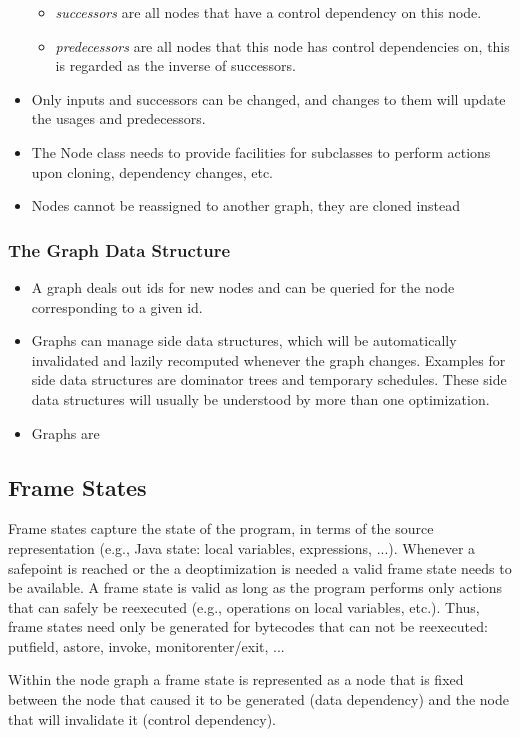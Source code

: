 \documentclass[twocolumn]{svjour3}
\begin{document}
\begin{itemize}
\begin{itemize}
        \item \emph{successors} are all nodes that have a control dependency on this node.
        \item \emph{predecessors} are all nodes that this node has control dependencies on, this is regarded as the inverse of successors.
    \end{itemize}
    \item Only inputs and successors can be changed, and changes to them will update the usages and predecessors.
    \item The Node class needs to provide facilities for subclasses to perform actions upon cloning, dependency changes, etc.
    \item Nodes cannot be reassigned to another graph, they are cloned instead
\end{itemize}

\subsubsection{The Graph Data Structure}
\begin{itemize}
    \item A graph deals out ids for new nodes and can be queried for the node corresponding to a given id.
    \item Graphs can manage side data structures, which will be automatically invalidated and lazily recomputed whenever the graph changes. Examples for side data structures are dominator trees and temporary schedules. These side data structures will usually be understood by more than one optimization.
    \item Graphs are 
\end{itemize}

\subsection{Frame States}
Frame states capture the state of the program, in terms of the source representation (e.g., Java state: local variables, expressions, ...).
Whenever a safepoint is reached or the a deoptimization is needed a valid frame state needs to be available.
A frame state is valid as long as the program performs only actions that can safely be reexecuted (e.g., operations on local variables, etc.).
Thus, frame states need only be generated for bytecodes that can not be reexecuted: putfield, astore, invoke, monitorenter/exit, ...

Within the node graph a frame state is represented as a node that is fixed between the node that caused it to be generated (data dependency) and the node that will invalidate it (control dependency).
\end{document}
